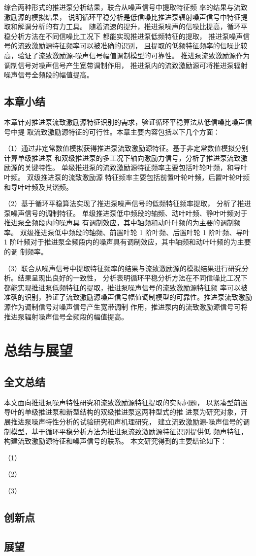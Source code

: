 综合两种形式的推进泵分析结果，联合从噪声信号中提取特征频
率的结果与流致激励源的模拟结果，
说明循环平稳分析是低信噪比推进泵辐射噪声信号中特征提取和解调分析的有力工具。
随着流速的提升，推进泵噪声的信噪比提高，循环平稳分析方法在不同信噪比工况下
都能实现推进泵低频特征的提取，
推进泵噪声信号的流致激励源特征频率可以被准确的识别，
且提取的低频特征频率的信噪比较高，验证了流致激励源-噪声信号幅值调制模型的可靠性。
推进泵流致激励源作为调制信号对噪声信号产生宽带调制作用，
推进泵内的流致激励源可将推进泵辐射噪声信号全频段的幅值提高。
\section{本章小结}
本章针对推进泵流致激励源特征识别的需求，验证循环平稳算法从低信噪比噪声信号中提
取流致激励源特征的可行性。本章主要内容包括以下几个方面：

（1）通过非定常数值模拟获得推进泵流致激励源特征。基于非定常数值模拟分别计算单级推进泵
和双级推进泵的多工况下轴向激励力信号，分析了推进泵流致激励源的关键特性。
单级推进泵的流致激励源特征频率主要包括叶轮叶频，和导叶叶频。
双级推进泵的流致激励源
特征频率主要包括前置叶轮叶频，后置叶轮叶频和导叶叶频及其谐频。

（2）基于循环平稳算法实现了推进泵噪声信号的低频特征频率提取，
分析了推进泵噪声信号的调制特征。
单级推进泵低中频段的轴频、动叶叶频、静叶叶频对于推进泵全频段内的噪声具
有调制效应，其中轴频和动叶叶频的为主要的调制频率。
双级推进泵低中频段的轴频、前置叶轮 1 阶叶频、后置叶轮 1 阶叶频、导叶
1 阶叶频对于推进泵全频段内的噪声具有调制效应，其中轴频和动叶叶频的为主要的调
制频率。

（3）联合从噪声信号中提取特征频率的结果与流致激励源的模拟结果进行研究分析。结果呈现出良好的一致性，
分析表明循环平稳分析方法在不同信噪比工况下都能实现推进泵低频特征的提取，推进泵噪声信号的流致激励源特征频
率可以被准确的识别，验证了流致激励源­噪声信号幅值调制模型的可靠性。推进泵流致激励源作为调制信号对噪声信号产生宽带调制
作用，推进泵内的流致激励源信号可将推进泵辐射噪声信号全频段的幅值提高。


\chapter{总结与展望}
\section{全文总结}
本文面向推进泵噪声特性研究和流致激励源特征提取的实际问题，
以紧凑型前置导叶的单级推进泵和新型结构的双级推进泵这两种型式的推
进泵为研究对象，开展推进泵噪声特性分析的试验研究和声机理研究，
建立流致激励源-­噪声信号的调制模型，基于循环平稳分析方法为推进泵流致激励源特征识别提供低
频声特征，构建流致激励源特征和噪声信号的联系。
本文研究得到的主要结论如下：

（1）

（2）

（3）
\section{创新点}
\section{展望}

